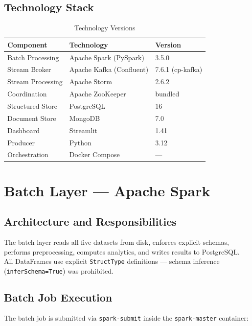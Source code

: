 \documentclass[12pt,a4paper]{article}
\begin{document}
\subsection{Technology Stack}

\begin{table}[H]
\centering
\caption{Technology Versions}
\begin{tabular}{lll}
\toprule
\textbf{Component} & \textbf{Technology} & \textbf{Version}\\
\midrule
Batch Processing & Apache Spark (PySpark) & 3.5.0 \\
Stream Broker & Apache Kafka (Confluent) & 7.6.1 (cp-kafka) \\
Stream Processing & Apache Storm & 2.6.2 \\
Coordination & Apache ZooKeeper & bundled \\
Structured Store & PostgreSQL & 16 \\
Document Store & MongoDB & 7.0 \\
Dashboard & Streamlit & 1.41 \\
Producer & Python & 3.12 \\
Orchestration & Docker Compose & — \\
\bottomrule
\end{tabular}
\end{table}

\section{Batch Layer — Apache Spark}

\subsection{Architecture and Responsibilities}

The batch layer reads all five datasets from disk, enforces explicit schemas, performs preprocessing, computes analytics, and writes results to PostgreSQL. All DataFrames use explicit \texttt{StructType} definitions — schema inference (\texttt{inferSchema=True}) was prohibited.

\subsection{Batch Job Execution}

The batch job is submitted via \texttt{spark-submit} inside the \texttt{spark-master} container:
\end{document}
